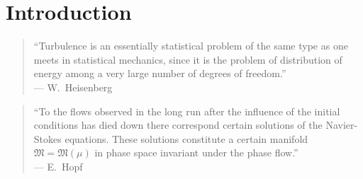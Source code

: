 \documentclass[aip,pof,preprint,floatfix,nofootinbib,amsmath,amssymb]{revtex4-2}
\begin{document}
\section{Introduction}

\begin{quote}
``Turbulence is an essentially statistical problem of the same type as one meets in statistical mechanics, since it is the
problem of distribution of energy among a very large number of degrees of freedom.''\\
\hspace*{\fill}--- W.~Heisenberg~\cite{Heisenberg1948PRSA}
\end{quote}

\noindent\begin{minipage}{\linewidth}
\begin{quote}
``To the flows observed in the long run after the influence of the initial conditions has died down there correspond
certain solutions of the Navier-Stokes equations. These solutions constitute a certain manifold
$\mathfrak{M}=\mathfrak{M}(\mu)$ in phase space invariant under the phase flow.''\\
\hspace*{\fill}--- E.~Hopf~\cite[p.~305]{Hopf1948}
\end{quote}
\end{minipage}
\medskip
\end{document}
